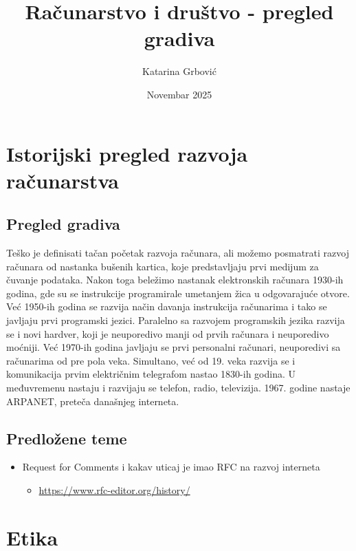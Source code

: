 \documentclass[a4paper,12pt]{article}
\title{Računarstvo i društvo - pregled gradiva}
\author{Katarina Grbović}
\date{Novembar 2025}
\begin{document}
\maketitle
\newpage
\tableofcontents
\newpage
\section{Istorijski pregled razvoja računarstva}
\subsection{Pregled gradiva}

Teško je definisati tačan početak razvoja računara, ali možemo posmatrati razvoj računara od nastanka bušenih kartica, koje predstavljaju prvi medijum za čuvanje podataka. Nakon toga beležimo nastanak elektronskih računara 1930-ih godina, gde su se instrukcije programirale umetanjem žica u odgovarajuće otvore. Već 1950-ih godina se razvija način davanja instrukcija računarima i tako se javljaju prvi programski jezici. Paralelno sa razvojem programskih jezika razvija se i novi hardver, koji je neuporedivo manji od prvih računara i neuporedivo moćniji. Već 1970-ih godina javljaju se prvi personalni računari, neuporedivi sa računarima od pre pola veka. Simultano, već od 19. veka razvija se i komunikacija prvim električnim telegrafom nastao 1830-ih godina. U međuvremenu nastaju i razvijaju se telefon, radio, televizija. 
1967. godine nastaje ARPANET, preteča današnjeg interneta.
\subsection{Predložene teme}
\begin{itemize}
    \item Request for Comments i kakav uticaj je imao RFC na razvoj interneta
    \begin{itemize}
        \item \url{https://www.rfc-editor.org/history/}
    \end{itemize}
\end{itemize}
\section{Etika}
\end{document}
